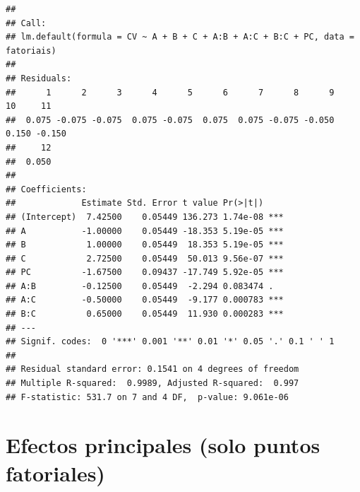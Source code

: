 \documentclass[
]{article}
\begin{document}
\begin{verbatim}
## 
## Call:
## lm.default(formula = CV ~ A + B + C + A:B + A:C + B:C + PC, data = fatoriais)
## 
## Residuals:
##      1      2      3      4      5      6      7      8      9     10     11 
##  0.075 -0.075 -0.075  0.075 -0.075  0.075  0.075 -0.075 -0.050  0.150 -0.150 
##     12 
##  0.050 
## 
## Coefficients:
##             Estimate Std. Error t value Pr(>|t|)    
## (Intercept)  7.42500    0.05449 136.273 1.74e-08 ***
## A           -1.00000    0.05449 -18.353 5.19e-05 ***
## B            1.00000    0.05449  18.353 5.19e-05 ***
## C            2.72500    0.05449  50.013 9.56e-07 ***
## PC          -1.67500    0.09437 -17.749 5.92e-05 ***
## A:B         -0.12500    0.05449  -2.294 0.083474 .  
## A:C         -0.50000    0.05449  -9.177 0.000783 ***
## B:C          0.65000    0.05449  11.930 0.000283 ***
## ---
## Signif. codes:  0 '***' 0.001 '**' 0.01 '*' 0.05 '.' 0.1 ' ' 1
## 
## Residual standard error: 0.1541 on 4 degrees of freedom
## Multiple R-squared:  0.9989, Adjusted R-squared:  0.997 
## F-statistic: 531.7 on 7 and 4 DF,  p-value: 9.061e-06
\end{verbatim}

\section{Efectos principales (solo puntos
fatoriales)}\label{efectos-principales-solo-puntos-fatoriales}
\end{document}
